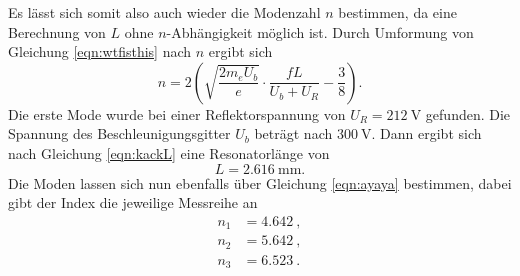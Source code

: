 Es lässt sich somit also auch wieder die Modenzahl $n$ bestimmen, da eine Berechnung von $L$ ohne $n$-Abhängigkeit möglich ist. Durch Umformung von Gleichung \ref{eqn:wtfisthis} nach $n$ 
ergibt sich
\begin{equation}
    \label{eqn:ayaya}
n = 2 \left(\sqrt{\frac{2m_eU_b}{e}} \cdot \frac{fL}{U_b + U_R} - \frac{3}{8}\right).
\end{equation}
Die erste Mode wurde bei einer Reflektorspannung von $U_R = \SI{212}{\volt}$ gefunden. Die Spannung des Beschleunigungsgitter $U_b$ beträgt nach \cite{skript} $\SI{300}{\volt}$.
Dann ergibt sich nach Gleichung \ref{eqn:kackL} eine Resonatorlänge von
\begin{equation}
L = \SI{2.616}{\milli\meter}.
\end{equation}
Die Moden lassen sich nun ebenfalls über Gleichung \ref{eqn:ayaya} bestimmen, dabei gibt der Index die jeweilige Messreihe an
\begin{align*}
n_1 &= \SI{4.642}{},\\
n_2 &= \SI{5.642}{},\\
n_3 &= \SI{6.523}{}.\\
\end{align*}
